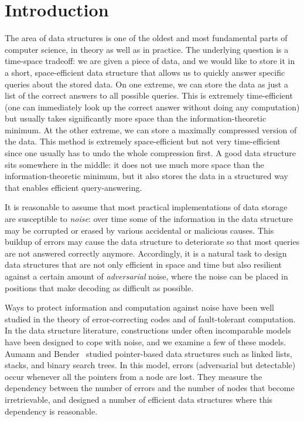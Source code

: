 \documentclass[11pt,english]{article}
\theoremstyle{definition}
\theoremstyle{remark}
\begin{document}
\section{Introduction}
The area of data structures is one of the oldest and most fundamental
parts of computer science, in theory as well as in practice. The
underlying question is a time-space tradeoff: we are given a piece
of data, and we would like to store it in a short, space-efficient
data structure that allows us to quickly answer specific queries about
the stored data. On one extreme, we can store the data as just
a list of the correct answers to all possible queries. This is extremely
time-efficient (one can immediately look up the correct answer without
doing any computation) but usually takes significantly more space
than the information-theoretic minimum. At the other extreme, we can
store a maximally compressed version of the data. This method is extremely
space-efficient but not very time-efficient since one usually has to undo
the whole compression first. A good data structure sits somewhere
in the middle: it does not use much more space than the information-theoretic
minimum, but it also stores the data in a structured way that enables
efficient query-answering.

It is reasonable to assume that most practical implementations of
data storage are susceptible to \emph{noise}: over time some of the
information in the data structure may be corrupted or erased by various
accidental or malicious causes. This buildup of errors may cause the
data structure to deteriorate so that most queries are not answered
correctly anymore. Accordingly, it is a natural task to design data
structures that are not only efficient in space and time but also
resilient against a certain amount of \emph{adversarial} noise, where
the noise can be placed in positions that make decoding as difficult
as possible. 

Ways to protect information and computation against noise
have been well studied in the theory of error-correcting codes
and of fault-tolerant computation. In the data structure
literature, constructions under often incomparable models have been
designed to cope with noise, and we examine a few of these models.
Aumann and Bender~\cite{aumann&bender:ftdata} studied pointer-based
data structures such as linked lists, stacks, and binary search trees.
In this model, errors (adversarial but detectable) occur whenever
all the pointers from a node are lost. They measure the dependency
between the number of errors and the number of nodes that become irretrievable,
and designed a number of efficient data structures where this dependency is reasonable.
\end{document}
